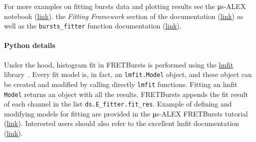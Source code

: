For more examples on fitting bursts data and plotting results see the
μs-ALEX notebook (\href{http://nbviewer.jupyter.org/github/tritemio/FRETBursts_notebooks/blob/master/notebooks/FRETBursts%20-%20us-ALEX%20smFRET%20burst%20analysis.ipynb}{link}).
the \textit{Fitting Framework} section of the documentation 
(\href{http://fretbursts.readthedocs.org/en/latest/fit.html}{link})
as well as the \verb|bursts_fitter| function documentation
(\href{http://fretbursts.readthedocs.org/en/latest/plugins.html#fretbursts.burstlib\_ext.bursts\_fitter}{link}).

\paragraph{Python details}
Under the hood, histogram fit in FRETBursts is performed using the
\href{http://lmfit.github.io/lmfit-py/}{lmfit} library~\cite{lmfit}.
Every fit model is, in fact, an \verb|lmfit.Model| object, and these object
can be created and modified by calling directly \verb|lmfit| functions.
Fitting an lmfit \verb|Model| returns an object with all the results.
FRETBursts appends the fit result of each channel in the list 
\verb|ds.E_fitter.fit_res|.
Example of defining and modifying models for fitting are provided in 
the μs-ALEX FRETBursts tutorial (\href{http://nbviewer.jupyter.org/github/tritemio/FRETBursts_notebooks/blob/master/notebooks/FRETBursts%20-%20us-ALEX%20smFRET%20burst%20analysis.ipynb}{link}). 
Interested users should also refer to the excellent lmfit documentation
(\href{http://lmfit.github.io/lmfit-py/}{link}).
